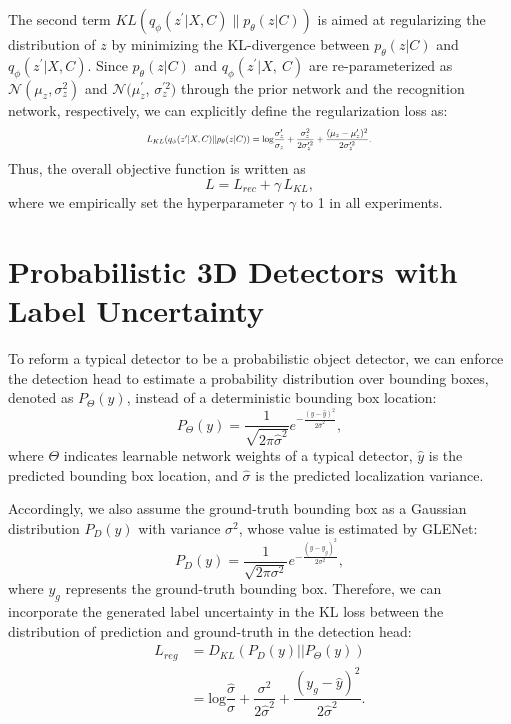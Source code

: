 \documentclass[twocolumn]{svjour3}
\begin{document}
The second term $ KL(q_{\phi}(z^{\prime} \vert X,C) \| p_{\theta}(z \vert C))$ is aimed at regularizing the distribution of $z$ by minimizing the KL-divergence between $p_{\theta}(z \vert C)$ and $q_{\phi}(z^{\prime} \vert X,C)$. Since $p_{\theta}(z \vert C)$ and $q_{\phi}(z^{\prime} \vert X,~C)$ are re-parameterized as $\mathcal{N}(\mu_{z}, \sigma_{z}^{2})$ and $\mathcal{N}(\mu_{z}^{\prime}$, $\sigma_z^{\prime2})$ through the prior network and the recognition network, respectively, we can explicitly define the regularization loss as:
\begin{equation}\label{GLENet_kl}
\resizebox{0.48\textwidth}{!}{
$L_{KL}(q_{\phi}(z^{\prime} \vert X,C) \|p_{\theta}(z \vert C)) = 
\mathrm{log}\dfrac{\sigma_z^{\prime}}{\sigma_z}
+ \dfrac{\sigma_z^2}{2\sigma_z^{\prime2}}
+ \dfrac{(\mu_{z}-\mu_{z}^{\prime})^2}{2\sigma_z^{\prime2}}$.
}
\end{equation}
Thus, the overall objective function is written as 
\begin{equation}
  L = L_{rec} + \gamma\,L_{KL},  
\end{equation}
where we empirically set the hyperparameter $\gamma$ to 1 in all experiments.


\section{Probabilistic 3D Detectors with Label Uncertainty} \label{bbr_label_uncertainty}





To reform a typical detector to be a probabilistic object detector, we can enforce the detection head to estimate a probability distribution over bounding boxes, denoted as $P_{\Theta}(y)$, instead of a deterministic bounding box location:\begin{equation}
P_{\Theta}(y)=\frac{1}{\sqrt{2\pi\hat{\sigma}^2}}e^{-\frac{(y-\hat{y})^2}{2\hat{\sigma}^2}},
\end{equation}
where $\Theta$ indicates learnable network weights of a typical detector, $\hat{y}$ is the predicted bounding box location, and $\hat{\sigma}$ is the predicted localization variance.

Accordingly, we also assume the ground-truth bounding box as a Gaussian distribution $P_{D}(y)$ with variance $\sigma^2$, whose value is estimated by GLENet: \begin{equation}
P_{D}(y)=\frac{1}{\sqrt{2\pi\sigma^2}}e^{-\frac{(y-y_g)^2}{2\sigma^2}},
\end{equation}
where $y_g$ represents the ground-truth bounding box.
Therefore, we can incorporate the generated label uncertainty in the KL loss between the distribution of prediction and ground-truth in the detection head:
\begin{equation}\label{bbr_kl_loss}
\begin{aligned}
L_{reg} &= D_{KL}(P_{D}(y)||P_{\Theta}(y))\\
&= \mathrm{log}\dfrac{\hat{\sigma}}{\sigma} + \dfrac{\sigma^2}{2\hat{\sigma}^2}+\dfrac{(y_g-\hat{y})^2}{2\hat{\sigma}^2}.
\end{aligned}
\end{equation}
\end{document}
